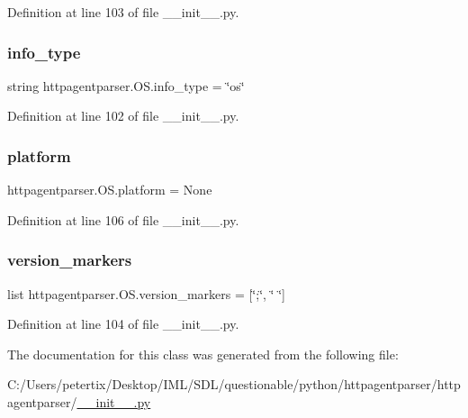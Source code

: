Definition at line 103 of file \+\_\+\+\_\+init\+\_\+\+\_\+.\+py.

\hypertarget{classhttpagentparser_1_1_o_s_af4c5bfb28e00aee54925609a234031d3}{}\label{classhttpagentparser_1_1_o_s_af4c5bfb28e00aee54925609a234031d3} 
\subsubsection{\texorpdfstring{info\+\_\+type}{info\_type}}
{\footnotesize\ttfamily string httpagentparser.\+O\+S.\+info\+\_\+type = \char`\"{}os\char`\"{}\hspace{0.3cm}{\ttfamily [static]}}



Definition at line 102 of file \+\_\+\+\_\+init\+\_\+\+\_\+.\+py.

\hypertarget{classhttpagentparser_1_1_o_s_acb4eafb62ce8ebabb23d950cd87e9458}{}\label{classhttpagentparser_1_1_o_s_acb4eafb62ce8ebabb23d950cd87e9458} 
\subsubsection{\texorpdfstring{platform}{platform}}
{\footnotesize\ttfamily httpagentparser.\+O\+S.\+platform = None\hspace{0.3cm}{\ttfamily [static]}}



Definition at line 106 of file \+\_\+\+\_\+init\+\_\+\+\_\+.\+py.

\hypertarget{classhttpagentparser_1_1_o_s_ace772b4f9442311faff87dc663d54938}{}\label{classhttpagentparser_1_1_o_s_ace772b4f9442311faff87dc663d54938} 
\subsubsection{\texorpdfstring{version\+\_\+markers}{version\_markers}}
{\footnotesize\ttfamily list httpagentparser.\+O\+S.\+version\+\_\+markers = \mbox{[}\char`\"{};\char`\"{}, \char`\"{} \char`\"{}\mbox{]}\hspace{0.3cm}{\ttfamily [static]}}



Definition at line 104 of file \+\_\+\+\_\+init\+\_\+\+\_\+.\+py.



The documentation for this class was generated from the following file\+:\begin{DoxyCompactItemize}
\item 
C\+:/\+Users/petertix/\+Desktop/\+I\+M\+L/\+S\+D\+L/questionable/python/httpagentparser/httpagentparser/\hyperlink{____init_____8py}{\+\_\+\+\_\+init\+\_\+\+\_\+.\+py}\end{DoxyCompactItemize}
